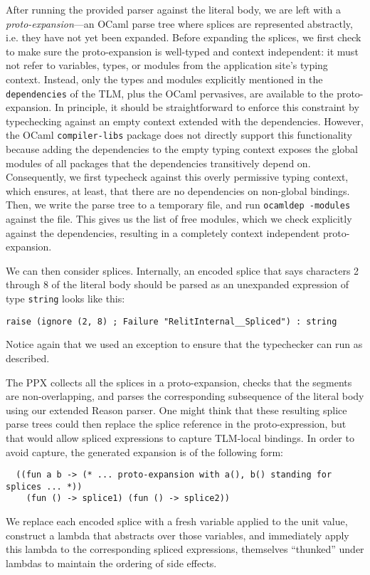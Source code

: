\documentclass[acmsmall]{acmart}
\newcommand{\li}[1]{\lstinline[basicstyle=\ttfamily\fontsize{9pt}{1em}\selectfont]{#1}}
\theoremstyle{slplain}
\numberwithin{thm}{section}
\begin{document}
After running the provided parser against the literal body, we are left with a \emph{proto-expansion}---an OCaml parse tree where splices are represented abstractly, i.e. they have not yet been expanded. Before expanding the splices, we first check to make sure the proto-expansion is well-typed and context independent: it must not refer to variables, types, or modules from the application site's typing context. Instead, only the types and modules explicitly mentioned in the \li{dependencies} of the TLM, plus the OCaml pervasives, are available to the proto-expansion. In principle, it should be straightforward to enforce this constraint by typechecking against an empty context extended with the dependencies. However, the OCaml \li{compiler-libs} package does not directly support this functionality because adding the dependencies to the empty typing context exposes the global modules of all packages that the dependencies transitively depend on. 
Consequently, we first typecheck against this overly permissive typing context, which ensures, at least, that there are no dependencies on non-global bindings. Then, we write the parse tree to a temporary file, and run \li{ocamldep -modules} against the file. This gives us the list of free modules, which we check explicitly against the dependencies, resulting in a completely context independent proto-expansion.

We can then consider splices. Internally, an encoded splice that says characters 2 through 8 of the literal body should be parsed as an unexpanded expression of type \li{string} looks like this:
\begin{lstlisting}[numbers=none]
  raise (ignore (2, 8) ; Failure "RelitInternal__Spliced") : string
\end{lstlisting}
Notice again that we used an exception to ensure that the typechecker can run as described. 

The PPX collects all the splices in a proto-expansion, checks that the segments are non-overlapping, and parses the corresponding subsequence of the literal body using our extended Reason parser. One might think that these resulting splice parse trees could then replace the splice reference in the proto-expression, but that would allow spliced expressions to capture TLM-local bindings. In order to avoid capture, the generated expansion is of the following form:
\begin{lstlisting}
  ((fun a b -> (* ... proto-expansion with a(), b() standing for splices ... *)) 
    (fun () -> splice1) (fun () -> splice2))
\end{lstlisting}
We replace each encoded splice with a fresh variable applied to the unit value, construct a lambda that abstracts over those variables, and immediately apply this lambda to the corresponding spliced expressions, themselves ``thunked'' under lambdas to maintain the ordering of side effects. 
\end{document}
